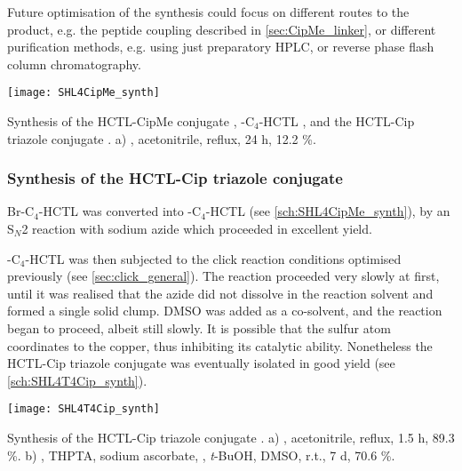 Future optimisation of the synthesis could focus on different routes to the product, e.g. the peptide coupling described in \ref{sec:CipMe_linker}, or different purification methods, e.g. using just preparatory HPLC, or reverse phase flash column chromatography.

\begin{scheme}[H]
	\begin{center}
		\texttt{[image: SHL4CipMe\_synth]}
		\caption{
			Synthesis of the HCTL-CipMe conjugate , 
			-C$_4$-HCTL , and
			the HCTL-Cip triazole conjugate .
			a) , acetonitrile, reflux, 24 h, 12.2 \%.
			\label{sch:SHL4CipMe_synth}}
	\end{center}
\end{scheme}

\subsubsection{Synthesis of the HCTL-Cip triazole conjugate }

Br-C$_4$-HCTL  was converted into -C$_4$-HCTL  (see \ref{sch:SHL4CipMe_synth}), by an S$_N$2 reaction with sodium azide which proceeded in excellent yield. 

-C$_4$-HCTL  was then subjected to the click reaction conditions optimised previously (see \ref{sec:click_general}). The reaction proceeded very slowly at first, until it was realised that the azide did not dissolve in the reaction solvent and formed a single solid clump. DMSO was added as a co-solvent, and the reaction began to proceed, albeit still slowly. It is possible that the sulfur atom coordinates to the copper, thus inhibiting its catalytic ability. Nonetheless the HCTL-Cip triazole conjugate  was eventually isolated in good yield (see \ref{sch:SHL4T4Cip_synth}).

\begin{scheme}[H]
	\begin{center}
		\texttt{[image: SHL4T4Cip\_synth]}
		\caption{
			Synthesis of the HCTL-Cip triazole conjugate .
			a) , acetonitrile, reflux, 1.5 h, 89.3 \%.
			b) , THPTA, sodium ascorbate, , \textit{t}-BuOH, DMSO, r.t., 7 d, 70.6 \%.
			\label{sch:SHL4T4Cip_synth}}
	\end{center}
\end{scheme}

